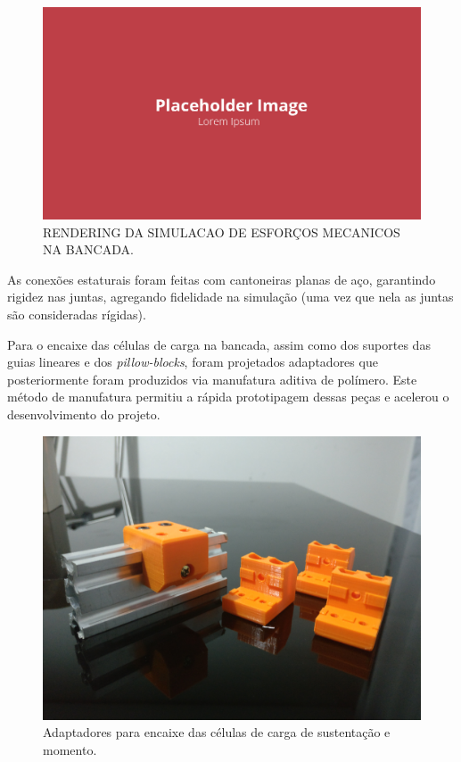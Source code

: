 \begin{figure}[!ht]
    \centering
    \includegraphics[width=.8\linewidth]{figuras/outras/placeholder.png}
    \caption{RENDERING DA SIMULACAO DE ESFORÇOS MECANICOS NA BANCADA\cite{autor}.}
    \label{fig:simulacao_etsrutural}
\end{figure}

As conexões estaturais foram feitas com cantoneiras planas de aço, garantindo rigidez nas juntas, agregando fidelidade na simulação (uma vez que nela as juntas são consideradas rígidas).

Para o encaixe das células de carga na bancada, assim como dos suportes das guias lineares e dos \textit{pillow-blocks}, foram projetados adaptadores que posteriormente foram produzidos via manufatura aditiva de polímero. Este método de manufatura permitiu a rápida prototipagem dessas peças e acelerou o desenvolvimento do projeto.

\begin{figure}[!ht]
    \centering
    \includegraphics[width=.8\linewidth]{figuras/construcao/suporte_reforcado_celulas_3.jpg}
    \caption{Adaptadores para encaixe das células de carga de sustentação e momento\cite{autor}.}
    \label{fig:encaixe_celulas_sustentacao}
\end{figure}


